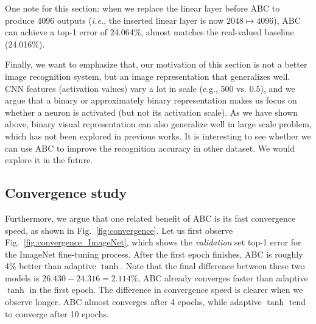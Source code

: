 \documentclass[runningheads]{llncs}
\begin{document}
One note for this section: when we replace the linear layer before ABC to produce 4096 outputs (\emph{i.e.}, the inserted linear layer is now $2048 \mapsto 4096$), ABC can achieve a top-1 error of 24.064\%, almost matches the real-valued baseline (24.016\%). 

Finally, we want to emphasize that, our motivation of this section is not a better image recognition system, but an image representation that generalizes well. CNN features (activation values) vary a lot in scale (e.g., 500 vs. 0.5), and we argue that a binary or approximately binary representation makes us focus on whether a neuron is activated (but not its activation scale). As we have shown above, binary visual representation can also generalize well in large scale problem, which has not been explored in previous works. It is interesting to see whether we can use ABC to improve the recognition accuracy in other dataset. We would explore it in the future. 


\subsection{Convergence study} \label{sec:exp:convergence}

Furthermore, we argue that one related benefit of ABC is its fast convergence speed, as shown in Fig.~\ref{fig:convergence}. Let us first observe Fig.~\ref{fig:convergence_ImageNet}, which shows the \emph{validation} set top-1 error for the ImageNet fine-tuning process. After the first epoch finishes, ABC is roughly 4\% better than adaptive $\tanh$. Note that the final difference between these two models is $26.430-24.316=2.114\%$, ABC already converges faster than adaptive $\tanh$ in the first epoch. The difference in convergence speed is clearer when we observe longer. ABC almost converges after 4 epochs, while adaptive $\tanh$ tend to converge after 10 epochs.

\begin{figure*}[t]
	\centering
	\hspace{10pt}
	\\
	\caption{Convergence comparison between the proposed ABC activation function and the adaptive $\tanh$ function.} \label{fig:convergence}
\end{figure*}
\end{document}
